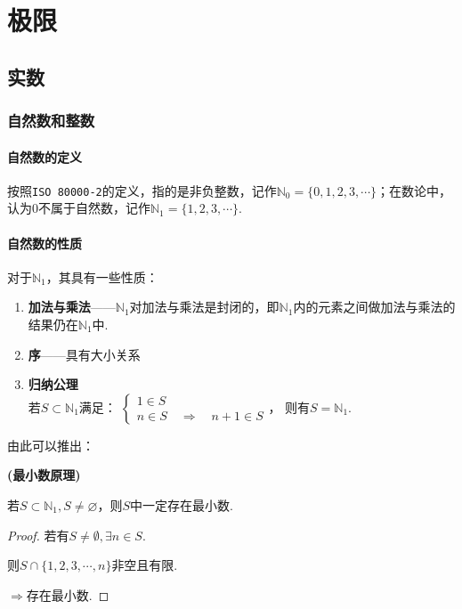 \chapter{极限}
\section{实数}
\subsection{自然数和整数}
\subsubsection{自然数的定义}
\begin{definition}
    按照\texttt{ISO 80000-2}的定义，指的是非负整数，记作$\mathbb{N}_0 = \{0,1,2,3,\cdots\}$；在数论中，认为0不属于自然数，记作$\mathbb{N}_1 = \{1,2,3,\cdots\}$.
\end{definition}

\subsubsection{自然数的性质}
对于$\mathbb{N}_1$，其具有一些性质：
\begin{enumerate}[property]
    \item \textbf{加法与乘法}——$\mathbb{N}_1$对加法与乘法是封闭的，即$\mathbb{N}_1$内的元素之间做加法与乘法的结果仍在$\mathbb{N}_1$中.
    \item \textbf{序}——具有大小关系
    \item \textbf{归纳公理}\\
    若$S \subset \mathbb{N}_1$满足：
    $\begin{cases}
        1 \in S \\
        n \in S \quad\Rightarrow\quad n+1 \in S
    \end{cases}$，
    则有$S = \mathbb{N}_1$.
\end{enumerate}
由此可以推出：
\begin{theorem}
    \textbf{(最小数原理)}

    若$S\subset \mathbb{N}_1, S \neq \varnothing $，则$S$中一定存在最小数.
\end{theorem}
\begin{proof}
    若有$S \neq \emptyset, \exists n \in S$.

    则$S \cap \{1,2,3,\cdots,n\}$非空且有限.

    $\Rightarrow$存在最小数.
\end{proof}

